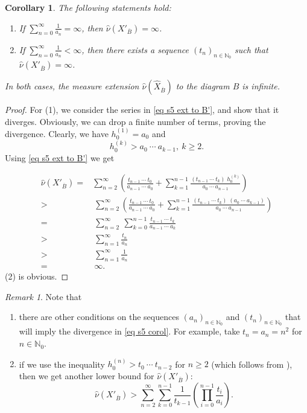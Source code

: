 \documentclass[11pt,reqno]{amsart}
\theoremstyle{definition}
\theoremstyle{remark}
\newtheorem{remark}[definition]{Remark}
\theoremstyle{plain}
\newtheorem{corol}[definition]{Corollary}
\def\ol{\overline}
\def\wh{\widehat}
\newcommand{\N}{\mathbb N}
\newcommand{\be}{\begin{equation}}
\newcommand{\ee}{\end{equation}}
\newcommand{\ba}{\begin{aligned}}
\newcommand{\ea}{\end{aligned}}
\numberwithin{equation}{section}
\begin{document}
\begin{corol} \label{cor s5}
The following statements hold:
\begin{enumerate}
    \item If $\sum_{n =0}^{\infty} \frac{1}{a_n} = \infty$, then $\wh\nu(X'_{\ol B}) = \infty$. 
    \item If $\sum_{n =0}^{\infty} \frac{1}{a_n} < \infty$, then there exists a sequence $(t_n)_{n \in \N_0}$ such that $\wh\nu(X'_{\ol B}) = \infty$. 
\end{enumerate}
In both cases, the measure extension $\wh\nu(\wh X_{\ol B})$ to the diagram $B$ is infinite. 
\end{corol}

\begin{proof}
For (1), we consider the series in \eqref{eq s5 ext to B'}, and show that it diverges. Obviously, we can drop a finite number of terms, proving the divergence. Clearly, we have $h_0^{(1)} = a_0$ and 
$$
h_0^{(k)} > a_0 \ \cdots \ a_{k-1}, \ k\geq 2.  
$$
Using \eqref{eq s5 ext to B'} we get 

\be\label{eq s5 corol}
\ba
\wh\nu(X'_{\ol B}) =  & \sum_{n=2}^{\infty}\left( \frac{t_{n-1} \ \cdots\ t_{0}}{a_{n-1}\ \cdots\ a_{0}} +  \sum_{k =1}^{n-1}
\frac{(t_{n-1} \ \cdots\ t_{k})\; h_0^{(k)}}
{a_0\ \cdots\ a_{n-1}}\right) \\
> &\ \sum_{n=2}^{\infty}\left( \frac{t_{n-1} \ \cdots\ t_{0}}{a_{n-1}\ \cdots\ a_{0}} + \sum_{k =1}^{n-1}
\frac{(t_{n-1} \ \cdots\ t_{k})\; (a_0\ \cdots \ a_{k-1})}
{a_0\ \cdots\ a_{n-1}}\right)\\
 = &\ \sum_{n=2}^{\infty} \ \sum_{k =0}^{n-1} 
 \frac{t_{n-1} \ \cdots\ t_k}{a_{n-1}\ \cdots\ a_k}\\ 
> &\ \sum_{n=1}^{\infty} \frac{t_n}{ a_n} \\
> &\ \sum_{n=1}^{\infty} \frac{1}{ a_n} \\
 = & \ \infty.
 \ea 
\ee
(2) is obvious.
\end{proof}

\begin{remark} Note that
\begin{enumerate}
\item there are other conditions on the sequences $(a_n)_{n \in \N_0}$ and $(t_n)_{n \in \N_0}$ that will imply the divergence in \eqref{eq s5 corol}. For example, take $t_n = a_n = n^2$ for $n \in \N_0$.
\item if we use the inequality $h_0^{(n)} > t_0 \ \cdots \ t_{n-2}$ for $n \geq 2$ (which follows from ), 
then we get another lower bound for $\wh\nu(X'_{\ol B})$:
$$
\wh\nu(X'_{\ol B}) > \sum_{n=2}^{\infty} \sum_{k= 0}^{n-1} \frac{1}{t_{k-1}} \left( \prod_{i=0}^{n-1} \frac{t_i}{a_i}\right).
$$
\end{enumerate}
\end{remark}
\end{document}
